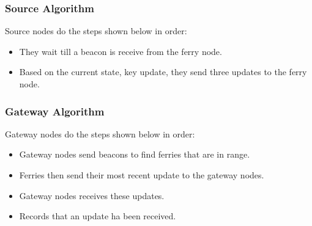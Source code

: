 \subsubsection{Source Algorithm}

Source nodes do the steps shown below in order:

\begin{itemize}
\item They wait till a beacon is receive from the ferry node.
\item Based on the current state, key update,  they send three updates to the ferry node.


\end{itemize}


\subsubsection{Gateway Algorithm}

Gateway nodes do the steps shown below in order:

\begin{itemize}
\item Gateway nodes send beacons to find ferries that are in range.
\item Ferries then send their most recent update to the gateway nodes.
\item Gateway nodes receives these updates.
\item Records that an update ha been received.
\end{itemize}






